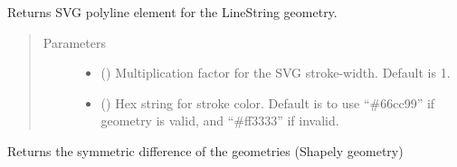 \documentclass[letterpaper,10pt,english]{sphinxmanual}
\begin{document}
\begin{fulllineitems}
\begin{fulllineitems}
\label{\detokenize{reference:taipanPyRouter.ESegment.svg}}
Returns SVG polyline element for the LineString geometry.
\begin{quote}\begin{description}
\item[{Parameters}] \leavevmode\begin{itemize}
\item {} 
 () \textendash{} Multiplication factor for the SVG stroke-width.  Default is 1.

\item {} 
 (\sphinxstyleliteralemphasis{\sphinxupquote{, }}) \textendash{} Hex string for stroke color. Default is to use “\#66cc99” if
geometry is valid, and “\#ff3333” if invalid.

\end{itemize}

\end{description}\end{quote}

\end{fulllineitems}


\begin{fulllineitems}
\label{\detokenize{reference:taipanPyRouter.ESegment.symmetric_difference}}
Returns the symmetric difference of the geometries
(Shapely geometry)

\end{fulllineitems}


\begin{fulllineitems}
\label{\detokenize{reference:taipanPyRouter.ESegment.to_wkb}}
\end{fulllineitems}



\end{fulllineitems}
\end{document}
